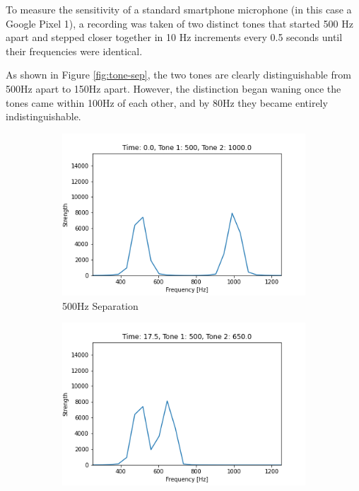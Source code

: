 To measure the sensitivity of a standard smartphone microphone (in this case a Google Pixel 1), a recording was taken of two distinct tones that started 500 Hz apart and stepped closer together in 10 Hz increments every 0.5 seconds until their frequencies were identical.

As shown in Figure \ref{fig:tone-sep}, the two tones are clearly distinguishable from 500Hz apart to 150Hz apart.
However, the distinction began waning once the tones came within 100Hz of each other, and by 80Hz they became entirely indistinguishable.

\begin{figure}[h]
    \centering
    \begin{subfigure}{0.5\textwidth}
        \centering
        \includegraphics[width=.90\linewidth]{Figures/4 Protocol Design/Tone Distinctiveness/0.06.png}
        \caption{500Hz Separation}
        \label{fig:tone-sep-500}
    \end{subfigure}%
    \begin{subfigure}{0.5\textwidth}
        \centering
        \includegraphics[width=.90\linewidth]{Figures/4 Protocol Design/Tone Distinctiveness/17.53.png}

\end{subfigure}
\end{figure}
